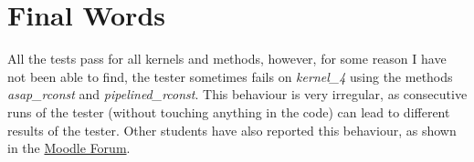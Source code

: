 \documentclass{article}
\begin{document}
    \section{Final Words}
    All the tests pass for all kernels and methods, however, for some reason I have not been able to find, the tester sometimes fails on \emph{kernel\_4} using the methods \emph{asap\_rconst} and \emph{pipelined\_rconst}. This behaviour is very irregular, as consecutive runs of the tester (without touching anything in the code) can lead to different results of the tester. Other students have also reported this behaviour, as shown in the \href{https://moodle-app2.let.ethz.ch/mod/forum/discuss.php?d=146066}{Moodle Forum}.
    
\end{document}
